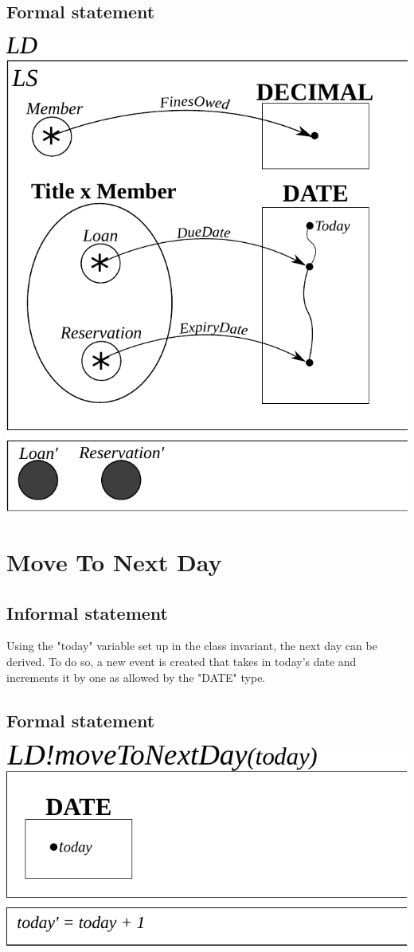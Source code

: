\documentclass[]{report}
\begin{document}
\subsection{Formal statement}
\begin{center}
\includegraphics{class_invariant.pdf}
\end{center}
\newpage
\section{Move To Next Day}
\subsection{Informal statement}
Using the "today" variable set up in the class invariant, the next day can be derived. To do so, a new event is created that takes in today's date and increments it by one as allowed by the "DATE" type.
\subsection{Formal statement}
\begin{center}
	\includegraphics{move_to_next_day.pdf}
\end{center}
\newpage
\end{document}
